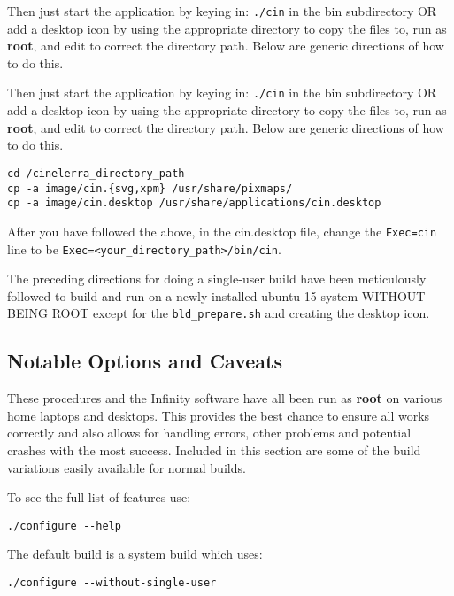 Then just start the application by keying in: \texttt{./cin} in the
bin subdirectory OR add a desktop icon by using the appropriate
directory to copy the files to, run as \textbf{root}, and edit to
correct the directory path.  Below are generic directions of how to
do this.

Then just start the application by keying in: \texttt{./cin} in the
bin subdirectory OR add a desktop icon by using the appropriate
directory to copy the files to, run as \textbf{root}, and edit to
correct the directory path.  Below are generic directions of how to
do this.

\begin{lstlisting}[style=sh]
cd /cinelerra_directory_path
cp -a image/cin.{svg,xpm} /usr/share/pixmaps/
cp -a image/cin.desktop /usr/share/applications/cin.desktop
\end{lstlisting}

After you have followed the above, in the cin.desktop file, change
the \texttt{Exec=cin} line to be
\texttt{Exec=<your\_directory\_path>/bin/cin}.

The preceding directions for doing a single-user build have been
meticulously followed to build and run on a newly installed ubuntu
15 system WITHOUT BEING ROOT except for the \texttt{bld\_prepare.sh}
and creating the desktop icon.


\subsection{Notable Options and Caveats}%
\label{sub:notable_options_and_caveats}

These procedures and the \CGG{} Infinity software have all been run
as \textbf{root} on various home laptops and desktops. This provides
the best chance to ensure all works correctly and also allows for
handling errors, other problems and potential crashes with the most
success.  Included in this section are some of the build variations
easily available for normal builds.

To see the full list of features use:

\begin{lstlisting}[style=sh]
./configure --help
\end{lstlisting}
The default build is a system build which uses:

\begin{lstlisting}[style=sh]
./configure --without-single-user
\end{lstlisting}

